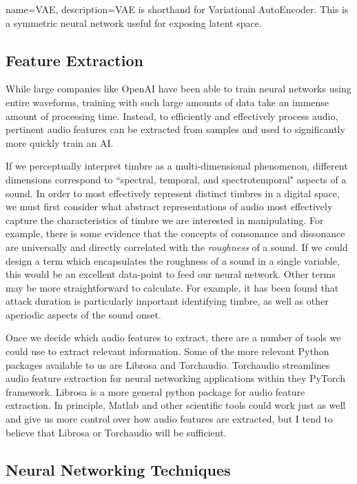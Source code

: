 \documentclass{article}
\begin{document}
{
    name=VAE,
    description={VAE is shorthand for Variational AutoEncoder. This is a symmetric neural network useful for exposing latent space.}
}

\subsection{Feature Extraction}

While large companies like OpenAI have been able to train neural networks using entire waveforms, training with such large amounts of data take an immense amount of processing time. \cite{Dhariwal2020} Instead, to efficiently and effectively process audio, pertinent audio features can be extracted from samples and used to significantly more quickly train an AI.

If we perceptually interpret timbre as a multi-dimensional phenomenon, different dimensions correspond to ``spectral, temporal, and spectrotemporal" aspects of a sound. \cite{McAdams2019} In order to most effectively represent distinct timbres in a digital space, we must first consider what abstract representations of audio most effectively capture the characteristics of timbre we are interested in manipulating.
For example, there is some evidence that the concepts of consonance and dissonance are universally and directly correlated with the \textit{roughness} of a sound. \cite{Milne2023} If we could design a term which encapsulates the roughness of a sound in a single variable, this would be an excellent data-point to feed our neural network. Other terms may be more straightforward to calculate. For example, it has been found that attack duration is particularly important identifying timbre, as well as other aperiodic aspects of the sound onset. \cite{Kai2019}

Once we decide which audio features to extract, there are a number of tools we could use to extract relevant information. Some of the more relevant Python packages available to us are Librosa and Torchaudio. Torchaudio streamlines audio feature extraction for neural networking applications within they PyTorch framework. \cite{Yang2021} Librosa is a more general python package for audio feature extraction. \cite{McFee2015} In principle, Matlab and other scientific tools could work just as well and give us more control over how audio features are extracted, but I tend to believe that Librosa or Torchaudio will be sufficient.


\subsection{Neural Networking Techniques}
\end{document}
